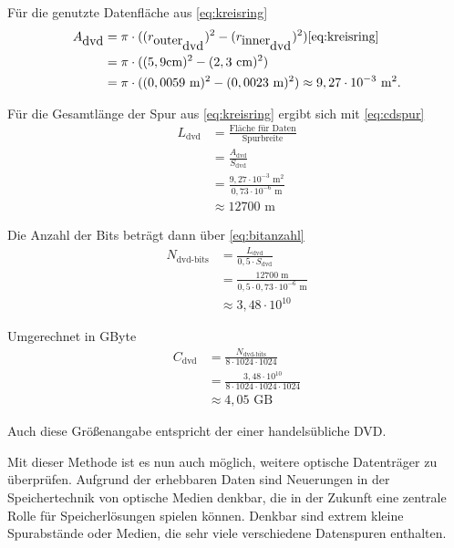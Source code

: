 \documentclass[9pt,twocolumn,twoside]{pnas-new}
\begin{document}
Für die genutzte Datenfläche aus \eqref{eq:kreisring}
\begin{align*}
 A_{\mbox{dvd}} &= \pi\cdot((r_{\mbox{outer}_{\mbox{dvd}}})^2-(r_{\mbox{inner}_{\mbox{dvd}}})^2)  \ref{eq:kreisring}\\	
&= \pi\cdot((5,9\mbox{cm})^2-(2,3\mbox{ cm})^2) \\
 &=  \pi\cdot((0,0059\mbox{ m})^2-(0,0023\mbox{ m})^2) \approx 9,27\cdot10^{-3}\mbox{ m}^2.
\end{align*}

Für die Gesamtlänge der Spur aus \ref{eq:kreisring} ergibt sich mit \eqref{eq:cdspur}
\begin{align*}
 L_{\mbox{dvd}} &= \frac{\mbox{Fläche für Daten}}{\mbox{Spurbreite}}\\
 &= \frac{A_{\mbox{dvd}}}{S_{\mbox{dvd}}}\\
 &= \frac{9,27\cdot10^{-3}\mbox{ m}^2}{0,73\cdot10^{-6}\mbox{ m} }\\
 &\approx 12700\mbox{ m}
\end{align*}

Die Anzahl der Bits beträgt dann über \eqref{eq:bitanzahl}
\begin{align*}
N_{\mbox{dvd-bits}} &=  \frac{L_{\mbox{dvd}}}{0,5\cdot S_{\mbox{dvd}}}\\
&= \frac{12700\mbox{ m}}{0,5\cdot 0,73\cdot10^{-6}\mbox{ m}}\\
&\approx 3,48\cdot 10^{10}
\end{align*}

Umgerechnet in GByte
\begin{align*}
C_{\mbox{dvd}} &= \frac{N_{\mbox{dvd-bits}}}{8\cdot1024\cdot1024}\\
&= \frac{3,48\cdot10^{10}}{8\cdot1024\cdot1024\cdot1024}\\
&\approx 4,05\mbox{ GB}
\end{align*}

Auch diese Größenangabe entspricht der einer handelsübliche DVD.


Mit dieser Methode ist es nun auch möglich, weitere optische Datenträger zu überprüfen.
Aufgrund der erhebbaren Daten sind Neuerungen in der Speichertechnik von optische Medien denkbar, die in der Zukunft eine zentrale Rolle für Speicherlösungen spielen können.
Denkbar sind extrem kleine Spurabstände oder Medien, die sehr viele verschiedene Datenspuren enthalten.


\end{document}
